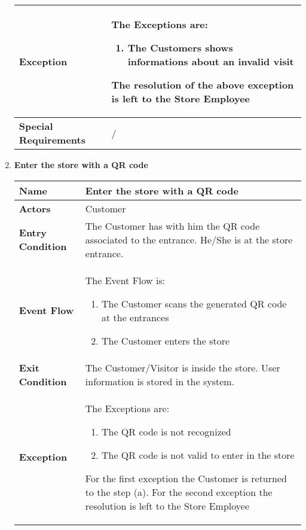 \begin{enumerate}
{\begin{longtable}{|L{4cm}|L{10cm}|}
                \textbf{Exception} & The Exceptions are: \begin{enumerate}
                        \item The Customers shows informations about an invalid visit
                    \end{enumerate} The resolution of the above exception is left to the Store Employee \\
                \hline
                \textbf{Special Requirements} & / \\
                \hline
            \end{longtable}}
            \item \textbf{Enter the store with a QR code}{\renewcommand{\arraystretch}{2}
            \begin{longtable}{|L{4cm}|L{10cm}|}
                \hline
                \textbf{Name} & Enter the store with a QR code \\
                \hline
                \textbf{Actors} & Customer \\
                \hline
                \textbf{Entry Condition} & The Customer has with him the QR code associated to the entrance. He/She is at the store entrance. \\
                \hline
                \textbf{Event Flow} & The Event Flow is: \begin{enumerate}
                        \item The Customer scans the generated QR code at the entrances
                        \item The Customer enters the store
                    \end{enumerate} \\
                \hline
                \textbf{Exit Condition} & The Customer/Visitor is inside the store. User information is stored in the system. \\
                \hline
                \textbf{Exception} & The Exceptions are: \begin{enumerate}
                        \item The QR code is not recognized
                        \item The QR code is not valid to enter in the store
                    \end{enumerate} For the first exception the Customer is returned to the step (a). For the second exception the resolution is left to the Store Employee \\
                \hline

\end{longtable}}
\end{enumerate}
